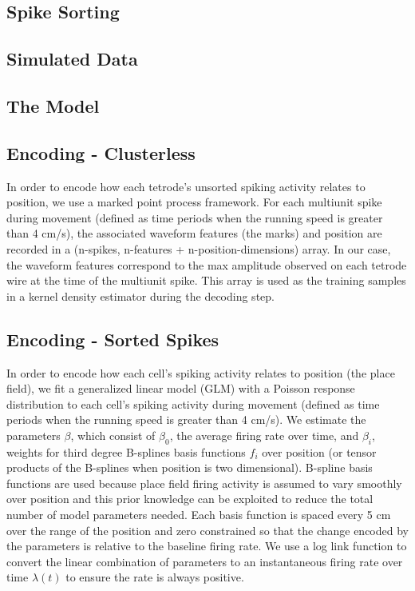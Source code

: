\documentclass[times, twoside]{zHenriquesLab-StyleBioRxiv}
\begin{document}
\subsection*{Spike Sorting}

\subsection*{Simulated Data}

\subsection*{The Model}

\subsection*{Encoding - Clusterless}
In order to encode how each tetrode's unsorted spiking activity relates to position, we use a marked point process framework. For each multiunit spike during movement (defined as time periods when the running speed is greater than 4 cm/s), the associated waveform features (the marks) and position are recorded in a (n-spikes, n-features + n-position-dimensions) array. In our case, the waveform features correspond to the max amplitude observed on each tetrode wire at the time of the multiunit spike. This array is used as the training samples in a kernel density estimator during the decoding step.

\subsection*{Encoding - Sorted Spikes}
In order to encode how each cell's spiking activity relates to position (the place field), we fit a generalized linear model (GLM) with a Poisson response distribution to each cell's spiking activity during movement (defined as time periods when the running speed is greater than 4 cm/s). We estimate the parameters $\beta$, which consist of $\beta_{0}$, the average firing rate over time, and $\beta_{i}$, weights for third degree B-splines basis functions $f_{i}$ over position (or tensor products of the B-splines when position is two dimensional). B-spline basis functions are used because place field firing activity is assumed to vary smoothly over position and this prior knowledge can be exploited to reduce the total number of model parameters needed. Each basis function is spaced every 5 cm over the range of the position and zero constrained so that the change encoded by the parameters is relative to the baseline firing rate. We use a log link function to convert the linear combination of parameters to an instantaneous firing rate over time $\lambda(t)$ to ensure the rate is always positive. 
\end{document}
